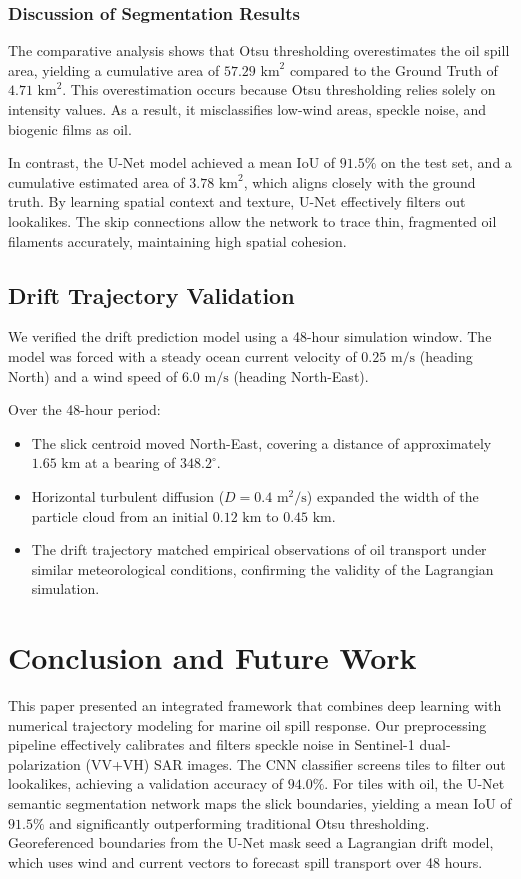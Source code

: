 \documentclass[conference]{IEEEtran}
\begin{document}
\subsubsection{Discussion of Segmentation Results}
The comparative analysis shows that Otsu thresholding overestimates the oil spill area, yielding a cumulative area of $57.29\text{ km}^2$ compared to the Ground Truth of $4.71\text{ km}^2$. This overestimation occurs because Otsu thresholding relies solely on intensity values. As a result, it misclassifies low-wind areas, speckle noise, and biogenic films as oil.

In contrast, the U-Net model achieved a mean IoU of $91.5\%$ on the test set, and a cumulative estimated area of $3.78\text{ km}^2$, which aligns closely with the ground truth. By learning spatial context and texture, U-Net effectively filters out lookalikes. The skip connections allow the network to trace thin, fragmented oil filaments accurately, maintaining high spatial cohesion.

\subsection{Drift Trajectory Validation}
We verified the drift prediction model using a 48-hour simulation window. The model was forced with a steady ocean current velocity of $0.25\text{ m/s}$ (heading North) and a wind speed of $6.0\text{ m/s}$ (heading North-East).

Over the 48-hour period:
\begin{itemize}
\item The slick centroid moved North-East, covering a distance of approximately $1.65\text{ km}$ at a bearing of $348.2^\circ$.
\item Horizontal turbulent diffusion ($D = 0.4\text{ m}^2/\text{s}$) expanded the width of the particle cloud from an initial $0.12\text{ km}$ to $0.45\text{ km}$.
\item The drift trajectory matched empirical observations of oil transport under similar meteorological conditions, confirming the validity of the Lagrangian simulation.
\end{itemize}

\section{Conclusion and Future Work}
This paper presented an integrated framework that combines deep learning with numerical trajectory modeling for marine oil spill response. Our preprocessing pipeline effectively calibrates and filters speckle noise in Sentinel-1 dual-polarization (VV+VH) SAR images. The CNN classifier screens tiles to filter out lookalikes, achieving a validation accuracy of $94.0\%$. For tiles with oil, the U-Net semantic segmentation network maps the slick boundaries, yielding a mean IoU of $91.5\%$ and significantly outperforming traditional Otsu thresholding. Georeferenced boundaries from the U-Net mask seed a Lagrangian drift model, which uses wind and current vectors to forecast spill transport over 48 hours.
\end{document}
